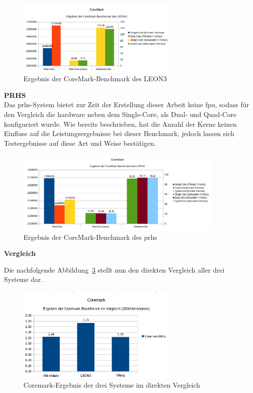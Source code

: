 \begin{figure}[H]
\centering
\includegraphics[width=0.7\textwidth]{Hauptteil/coremarkleon3.png}
\caption{Ergebnis der CoreMark-Benchmark des LEON3}
\label{fig:coremarkleon3}
\end{figure}


\textbf{PRHS}\\
Das \ac{prhs}-System bietet zur Zeit der Erstellung dieser Arbeit keine \ac{fpu}, sodass für den Vergleich die hardware neben dem Single-Core, als Dual- und Quad-Core konfiguriert wurde.
Wie bereits beschrieben, hat die Anzahl der Kerne keinen Einfluss auf die Leistungsergebnisse bei dieser Benchmark, jedoch lassen sich Testergebnisse auf diese Art und Weise bestätigen.\\

\begin{figure}[H]
\centering
\includegraphics[width=0.9\textwidth]{Hauptteil/coremarkprhs.png}
\caption{Ergebnis der CoreMark-Benchmark des \ac{prhs}}
\label{fig:coremarkprhs}
\end{figure}

\textbf{Vergleich}

Die nachfolgende Abbildung~\ref{fig:coremarkresult} stellt nun den direkten Vergleich aller drei Systeme dar.\\

\begin{figure}[H]
\centering
\includegraphics[width=0.7\textwidth]{Hauptteil/coremarkresult.png}
\caption{Coremark-Ergebnis der drei Systeme im direkten Vergleich}
\label{fig:coremarkresult}
\end{figure}


